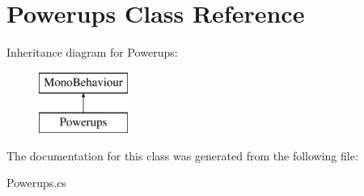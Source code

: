 \hypertarget{class_powerups}{}\section{Powerups Class Reference}
\label{class_powerups}
Inheritance diagram for Powerups\+:\begin{figure}[H]
\begin{center}
\leavevmode
\includegraphics[height=2.000000cm]{class_powerups}
\end{center}
\end{figure}


The documentation for this class was generated from the following file\+:\begin{DoxyCompactItemize}
\item 
Powerups.\+cs\end{DoxyCompactItemize}
